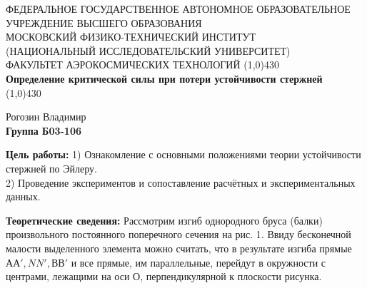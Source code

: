 \documentclass[a4paper,12pt]{article}
\begin{document}
\begin{titlepage}
\begin{center}
\large{\small ФЕДЕРАЛЬНОЕ ГОСУДАРСТВЕННОЕ АВТОНОМНОЕ ОБРАЗОВАТЕЛЬНОЕ\\ УЧРЕЖДЕНИЕ ВЫСШЕГО ОБРАЗОВАНИЯ \\ МОСКОВСКИЙ ФИЗИКО-ТЕХНИЧЕСКИЙ ИНСТИТУТ\\ (НАЦИОНАЛЬНЫЙ ИССЛЕДОВАТЕЛЬСКИЙ УНИВЕРСИТЕТ)\\ ФАКУЛЬТЕТ АЭРОКОСМИЧЕСКИХ ТЕХНОЛОГИЙ}
\vfill
\line(1,0){430}\\[1mm]
\huge\textbf{Определение критической силы при потери устойчивости стержней}\\
\line(1,0){430}\\[1mm]
\vfill
\begin{flushright}
\normalsize{Рогозин Владимир}\\
\normalsize{\textbf{Группа Б03-106}}\\
\end{flushright}
\end{center}
\end{titlepage}

\textbf{Цель работы:} 
1) Ознакомление с основными положениями теории устойчивости стержней по Эйлеру. \\
2) Проведение экспериментов и сопоставление расчётных и экспериментальных данных. 

\textbf{Теоретические сведения:}
Рассмотрим изгиб однородного бруса (балки) произвольного постоянного поперечного сечения на рис. 1. Ввиду бесконечной малости выделенного элемента можно считать, что в результате изгиба прямые $АА', NN', ВВ'$ и все прямые, им параллельные, перейдут в окружности с центрами, лежащими на оси О, перпендикулярной к плоскости рисунка.
\end{document}
